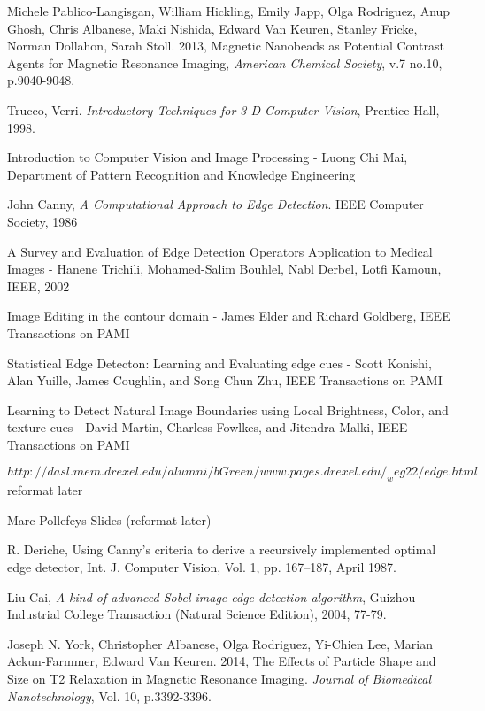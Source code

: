 \documentclass[a4paper,12pt]{article}
\begin{document}
\newpage
\singlespacing
\begin{thebibliography}{9}


Michele Pablico-Langisgan, William Hickling, Emily Japp, Olga Rodriguez, Anup Ghosh, Chris Albanese, Maki Nishida, Edward Van Keuren, Stanley Fricke, Norman Dollahon, Sarah Stoll. 2013, Magnetic Nanobeads as Potential Contrast Agents for Magnetic Resonance Imaging, {\em American Chemical Society}, v.7 no.10, p.9040-9048.

Trucco, Verri. {\em Introductory Techniques for 3-D Computer Vision}, Prentice Hall, 1998.

Introduction to Computer Vision and Image Processing - Luong Chi Mai, Department of Pattern Recognition and Knowledge Engineering

John Canny, {\em A Computational Approach to Edge Detection}. IEEE Computer Society, 1986

A Survey and Evaluation of Edge Detection Operators Application to Medical Images - Hanene Trichili, Mohamed-Salim Bouhlel, Nabl Derbel, Lotfi Kamoun, IEEE, 2002

Image Editing in the contour domain - James Elder and Richard Goldberg, IEEE Transactions on PAMI

Statistical Edge Detecton: Learning and Evaluating edge cues - Scott Konishi, Alan Yuille, James Coughlin, and Song Chun Zhu, IEEE Transactions on PAMI

Learning to Detect Natural Image Boundaries using Local Brightness, Color, and texture cues - David Martin, Charless Fowlkes, and Jitendra Malki, IEEE Transactions on PAMI

$http://dasl.mem.drexel.edu/alumni/bGreen/www.pages.drexel.edu/_weg22/edge.html$ reformat later

Marc Pollefeys Slides (reformat later)

R. Deriche, Using Canny's criteria to derive a recursively implemented optimal edge detector, Int. J. Computer Vision, Vol. 1, pp. 167–187, April 1987.

Liu Cai,  {\em A  kind  of  advanced  Sobel  image  edge detection  algorithm}, Guizhou Industrial College Transaction (Natural Science Edition), 2004, 77-79. 

Joseph N. York, Christopher Albanese, Olga Rodriguez, Yi-Chien Lee, Marian Ackun-Farmmer, Edward Van Keuren. 2014, The Effects of Particle Shape and Size on T2 Relaxation in Magnetic Resonance Imaging. {\em Journal of Biomedical Nanotechnology}, Vol. 10, p.3392-3396.


\end{thebibliography}
\end{document}

